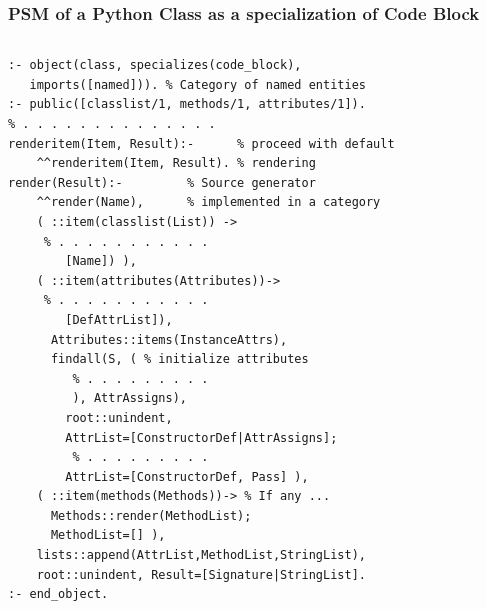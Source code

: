 \documentclass[10pt]{beamer}
\begin{document}
\begin{frame}[fragile]
  \frametitle{PSM of a Python Class as a specialization of Code Block}
  \begin{columns}
    \begin{column}{0.6\textwidth}
      \flushleft
\begin{verbatim}
:- object(class, specializes(code_block),
   imports([named])). % Category of named entities
:- public([classlist/1, methods/1, attributes/1]).
% . . . . . . . . . . . . . .
renderitem(Item, Result):-      % proceed with default
    ^^renderitem(Item, Result). % rendering
render(Result):-         % Source generator
    ^^render(Name),      % implemented in a category
    ( ::item(classlist(List)) ->
     % . . . . . . . . . . .
        [Name]) ),
    ( ::item(attributes(Attributes))->
     % . . . . . . . . . . .
        [DefAttrList]),
      Attributes::items(InstanceAttrs),
      findall(S, ( % initialize attributes
         % . . . . . . . . .
         ), AttrAssigns),
        root::unindent,
        AttrList=[ConstructorDef|AttrAssigns];
         % . . . . . . . . .
        AttrList=[ConstructorDef, Pass] ),
    ( ::item(methods(Methods))-> % If any ...
      Methods::render(MethodList);
      MethodList=[] ),
    lists::append(AttrList,MethodList,StringList),
    root::unindent, Result=[Signature|StringList].
:- end_object.
\end{verbatim}
    \end{column}
    \begin{column}{0.4\linewidth}

\end{column}
\end{columns}
\end{frame}
\end{document}
